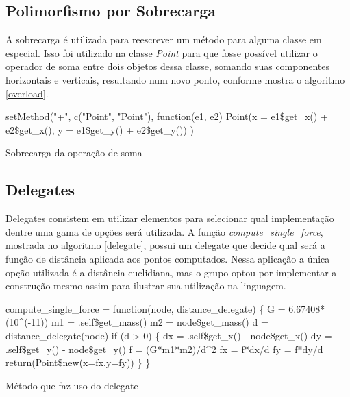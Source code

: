\documentclass[rel_mlp]{iiufrgs}
\makeatletter
\newcommand{\nosemic}{\renewcommand{\@endalgocfline}{\relax}}%
\makeatother
\begin{document}
    \label{parametric}



\subsection{Polimorfismo por Sobrecarga}

    A sobrecarga é utilizada para reescrever um método para alguma classe em especial. Isso foi utilizado
    na classe \textit{Point} para que fosse possível utilizar o operador de soma entre dois objetos dessa
    classe, somando suas componentes horizontais e verticais, resultando num novo ponto, conforme mostra
    o algoritmo \ref{overload}.

    \begin{algorithm}
    \label{overload}
    \nosemic setMethod("+", c("Point", "Point"), function(e1, e2) {\;
    \nosemic  Point(x = e1{\$}get{\_}x() + e2{\$}get{\_}x(), y = e1{\$}get{\_}y() + e2{\$}get{\_}y())\;
    \nosemic })\;

    \caption{Sobrecarga da operação de soma}
    \end{algorithm}


\subsection{Delegates}

    Delegates consistem em utilizar elementos para selecionar qual implementação dentre uma gama
    de opções será utilizada.
    A função \textit{compute{\_}single{\_}force}, mostrada no algoritmo \ref{delegate}, possui um
    delegate que decide qual será a função de distância aplicada aos pontos computados. Nessa aplicação
    a única opção utilizada é a distância euclidiana, mas o grupo optou por implementar a construção
    mesmo assim para ilustrar sua utilização na linguagem.

\begin{algorithm}
\label{delegate}
\nosemic compute{\_}single{\_}force = function(node, distance{\_}delegate) {\{}\;
\nosemic  G = 6.67408*(10\string^(-11))\;
\nosemic  m1 = .self{\$}get{\_}mass()\;
\nosemic  m2 = node{\$}get{\_}mass()\;
\nosemic  d = distance{\_}delegate(node)\;
\nosemic  if (d > 0) {\{}\;
\nosemic    dx = .self{\$}get{\_}x() - node{\$}get{\_}x()\;
\nosemic    dy = .self{\$}get{\_}y() - node{\$}get{\_}y()\;
\nosemic    f = (G*m1*m2)/d\string^2\;
\nosemic    fx = f*dx/d\;
\nosemic    fy = f*dy/d\;
\nosemic    return(Point{\$}new(x=fx,y=fy))\;
\nosemic  {\}}\;
\nosemic {\}}\;
\caption{Método que faz uso do delegate}
\end{algorithm}
\end{document}
